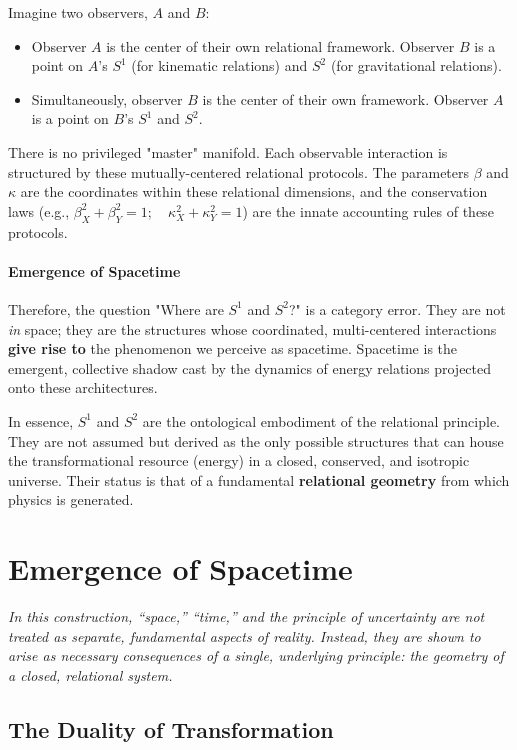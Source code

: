 \documentclass[12pt, a4paper]{article}
\begin{document}
Imagine two observers, \(A\) and \(B\):
\begin{itemize}
    \item Observer \(A\) is the center of their own relational framework. Observer \(B\) is a point on \(A\)'s \(S^1\) (for kinematic relations) and \(S^2\) (for gravitational relations).
    \item Simultaneously, observer \(B\) is the center of their own framework. Observer \(A\) is a point on \(B\)'s \(S^1\) and \(S^2\).
\end{itemize}
There is no privileged "master" manifold. Each observable interaction is structured by these mutually-centered relational protocols. The parameters \(\beta\) and \(\kappa\) are the coordinates within these relational dimensions, and the conservation laws (e.g., \(\beta_X^2 + \beta_Y^2 = 1; \quad \kappa_X^2 + \kappa_Y^2 = 1\)) are the innate accounting rules of these protocols.

\paragraph{Emergence of Spacetime}
Therefore, the question "Where are \(S^1\) and \(S^2\)?" is a category error. They are not \textit{in} space; they are the structures whose coordinated, multi-centered interactions \textbf{give rise to} the phenomenon we perceive as spacetime. Spacetime is the emergent, collective shadow cast by the dynamics of energy relations projected onto these architectures.

In essence, \(S^1\) and \(S^2\) are the ontological embodiment of the relational principle. They are not assumed but derived as the only possible structures that can house the transformational resource (energy) in a closed, conserved, and isotropic universe. Their status is that of a fundamental \textbf{relational geometry} from which physics is generated.

\section{Emergence of Spacetime}

\textit{In this construction, ``space,'' ``time,'' and the principle of uncertainty are not treated as separate, fundamental aspects of reality. Instead, they are shown to arise as necessary consequences of a single, underlying principle: the geometry of a closed, relational system.}

\subsection{The Duality of Transformation}
\end{document}
